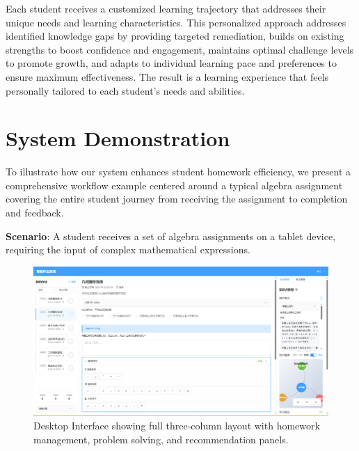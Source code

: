 \documentclass[conference]{IEEEtran}
\begin{document}
Each student receives a customized learning trajectory that addresses their unique needs and learning characteristics. This personalized approach addresses identified knowledge gaps by providing targeted remediation, builds on existing strengths to boost confidence and engagement, maintains optimal challenge levels to promote growth, and adapts to individual learning pace and preferences to ensure maximum effectiveness. The result is a learning experience that feels personally tailored to each student's needs and abilities.

\section{System Demonstration}

To illustrate how our system enhances student homework efficiency, we present a comprehensive workflow example centered around a typical algebra assignment covering the entire student journey from receiving the assignment to completion and feedback.



\textbf{Scenario}: A student receives a set of algebra assignments on a tablet device, requiring the input of complex mathematical expressions.

\begin{figure}[htbp]
\centerline{\includegraphics[width=\columnwidth]{5a.png}}
\caption{Desktop Interface showing full three-column layout with homework management, problem solving, and recommendation panels.}
\label{fig:desktop}
\end{figure}
\end{document}
